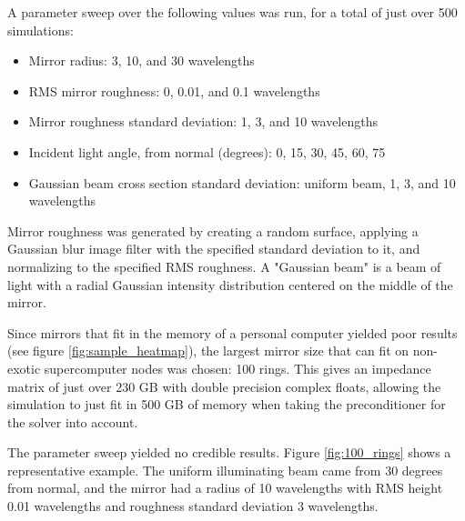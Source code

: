\documentclass[etd,twoside,senior,noacknowledgments]{BYUPhys}
\begin{document}
A parameter sweep over the following values was run, for a total of just over 500 simulations:

\begin{itemize}
  \item Mirror radius: 3, 10, and 30 wavelengths
  \item RMS mirror roughness: 0, 0.01, and 0.1 wavelengths
  \item Mirror roughness standard deviation: 1, 3, and 10 wavelengths
  \item Incident light angle, from normal (degrees): 0, 15, 30, 45, 60, 75
  \item Gaussian beam cross section standard deviation: uniform beam, 1, 3, and 10 wavelengths
\end{itemize}

Mirror roughness was generated by creating a random surface, applying a Gaussian blur image filter with the specified standard deviation to it, and normalizing to the specified RMS roughness. A "Gaussian beam" is a beam of light with a radial Gaussian intensity distribution centered on the middle of the mirror.

Since mirrors that fit in the memory of a personal computer yielded poor results (see figure \ref{fig:sample_heatmap}), the largest mirror size that can fit on non-exotic supercomputer nodes was chosen: 100 rings. This gives an impedance matrix of just over 230 GB with double precision complex floats, allowing the simulation to just fit in 500 GB of memory when taking the preconditioner for the solver into account.

The parameter sweep yielded no credible results. Figure \ref{fig:100_rings} shows a representative example. The uniform illuminating beam came from 30 degrees from normal, and the mirror had a radius of 10 wavelengths with RMS height 0.01 wavelengths and roughness standard deviation 3 wavelengths.
\end{document}

